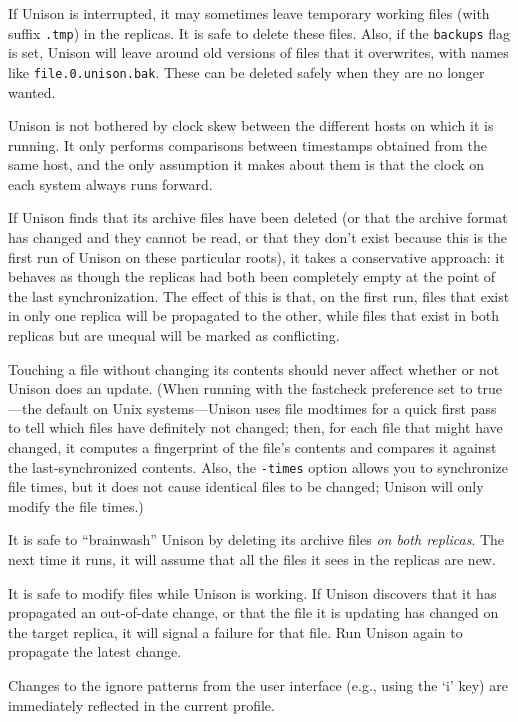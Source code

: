 \documentclass{article}
\begin{document}
If Unison is interrupted, it may sometimes leave temporary working files
(with suffix \verb|.tmp|) in the replicas.  It is safe to delete these
files.  Also, if the \verb|backups| flag is set, Unison will
leave around old versions of files that it overwrites, with names like
\verb|file.0.unison.bak|.  These can be deleted safely when they are no
longer wanted.

Unison is not bothered by clock skew between the different hosts on
which it is running.  It only performs comparisons between timestamps
obtained from the same host, and the only assumption it makes about
them is that the clock on each system always runs forward.

If Unison finds that its archive files have been deleted (or that the
archive format has changed and they cannot be read, or that they don't
exist because this is the first run of Unison on these particular
roots), it takes a conservative approach: it behaves as though the
replicas had both been completely empty at the point of the last
synchronization.  The effect of this is that, on the first run, files
that exist in only one replica will be propagated to the other, while
files that exist in both replicas but are unequal will be marked as
conflicting.

Touching a file without changing its contents should never affect whether or
not Unison does an update. (When running with the fastcheck preference set
to true---the default on Unix systems---Unison uses file modtimes for a
quick first pass to tell which files have definitely not changed; then, for
each file that might have changed, it computes a fingerprint of the file's
contents and compares it against the last-synchronized contents. Also, the
\verb|-times| option allows you to synchronize file times, but it does not
cause identical files to be changed; Unison will only modify the file
times.)

It is safe to ``brainwash'' Unison by deleting its archive files
{\em on both replicas}.  The next time it runs, it will assume that
all the files it sees in the replicas are new.

It is safe to modify files while Unison is working.  If Unison
discovers that it has propagated an out-of-date change, or that the
file it is updating has changed on the target replica, it will signal
a failure for that file.  Run Unison again to propagate the latest
change.

Changes to the ignore patterns from the user interface (e.g., using
the `i' key) are immediately reflected in the current profile.
\end{document}
